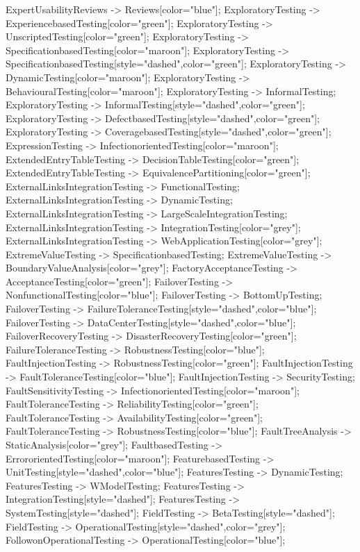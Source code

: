 \documentclass{article}
\begin{document}
{ExpertUsabilityReviews -> Reviews[color="blue"];
ExploratoryTesting -> ExperiencebasedTesting[color="green"];
ExploratoryTesting -> UnscriptedTesting[color="green"];
ExploratoryTesting -> SpecificationbasedTesting[color="maroon"];
ExploratoryTesting -> SpecificationbasedTesting[style="dashed",color="green"];
ExploratoryTesting -> DynamicTesting[color="maroon"];
ExploratoryTesting -> BehaviouralTesting[color="maroon"];
ExploratoryTesting -> InformalTesting;
ExploratoryTesting -> InformalTesting[style="dashed",color="green"];
ExploratoryTesting -> DefectbasedTesting[style="dashed",color="green"];
ExploratoryTesting -> CoveragebasedTesting[style="dashed",color="green"];
ExpressionTesting -> InfectionorientedTesting[color="maroon"];
ExtendedEntryTableTesting -> DecisionTableTesting[color="green"];
ExtendedEntryTableTesting -> EquivalencePartitioning[color="green"];
ExternalLinksIntegrationTesting -> FunctionalTesting;
ExternalLinksIntegrationTesting -> DynamicTesting;
ExternalLinksIntegrationTesting -> LargeScaleIntegrationTesting;
ExternalLinksIntegrationTesting -> IntegrationTesting[color="grey"];
ExternalLinksIntegrationTesting -> WebApplicationTesting[color="grey"];
ExtremeValueTesting -> SpecificationbasedTesting;
ExtremeValueTesting -> BoundaryValueAnalysis[color="grey"];
FactoryAcceptanceTesting -> AcceptanceTesting[color="green"];
FailoverTesting -> NonfunctionalTesting[color="blue"];
FailoverTesting -> BottomUpTesting;
FailoverTesting -> FailureToleranceTesting[style="dashed",color="blue"];
FailoverTesting -> DataCenterTesting[style="dashed",color="blue"];
FailoverRecoveryTesting -> DisasterRecoveryTesting[color="green"];
FailureToleranceTesting -> RobustnessTesting[color="blue"];
FaultInjectionTesting -> RobustnessTesting[color="green"];
FaultInjectionTesting -> FaultToleranceTesting[color="blue"];
FaultInjectionTesting -> SecurityTesting;
FaultSensitivityTesting -> InfectionorientedTesting[color="maroon"];
FaultToleranceTesting -> ReliabilityTesting[color="green"];
FaultToleranceTesting -> AvailabilityTesting[color="green"];
FaultToleranceTesting -> RobustnessTesting[color="blue"];
FaultTreeAnalysis -> StaticAnalysis[color="grey"];
FaultbasedTesting -> ErrororientedTesting[color="maroon"];
FeaturebasedTesting -> UnitTesting[style="dashed",color="blue"];
FeaturesTesting -> DynamicTesting;
FeaturesTesting -> WModelTesting;
FeaturesTesting -> IntegrationTesting[style="dashed"];
FeaturesTesting -> SystemTesting[style="dashed"];
FieldTesting -> BetaTesting[style="dashed"];
FieldTesting -> OperationalTesting[style="dashed",color="grey"];
FollowonOperationalTesting -> OperationalTesting[color="blue"];
}
\end{document}
